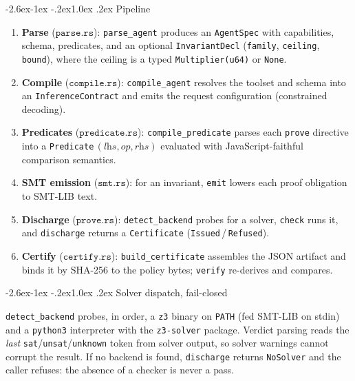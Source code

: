 \documentclass[11pt]{article}
\makeatletter
\renewcommand\subsection{\@startsection{subsection}{2}{\z@}%
  {-2.6ex\@plus -1ex \@minus -.2ex}{1.0ex \@plus .2ex}%
  {\normalfont\sffamily\large\bfseries}}
\theoremstyle{plain}
\theoremstyle{definition}
\theoremstyle{remark}
\makeatother
\begin{document}
\subsection{Pipeline}

\begin{enumerate}
\item \textbf{Parse} ($\texttt{parse.rs}$): \texttt{parse\_agent} produces an
  \texttt{AgentSpec} with capabilities, schema, predicates, and an optional
  \texttt{InvariantDecl} (\texttt{family}, \texttt{ceiling}, \texttt{bound}),
  where the ceiling is a typed \texttt{Multiplier(u64)} or \texttt{None}.
\item \textbf{Compile} ($\texttt{compile.rs}$): \texttt{compile\_agent}
  resolves the toolset and schema into an \texttt{InferenceContract} and emits
  the request configuration (constrained decoding).
\item \textbf{Predicates} ($\texttt{predicate.rs}$):
  \texttt{compile\_predicate} parses each \texttt{prove} directive into a
  \texttt{Predicate}\,$(\textit{lhs},\textit{op},\textit{rhs})$ evaluated with
  JavaScript-faithful comparison semantics.
\item \textbf{SMT emission} ($\texttt{smt.rs}$): for an invariant,
  \texttt{emit} lowers each proof obligation to SMT-LIB text.
\item \textbf{Discharge} ($\texttt{prove.rs}$): \texttt{detect\_backend}
  probes for a solver, \texttt{check} runs it, and \texttt{discharge} returns a
  \texttt{Certificate} (\texttt{Issued}\,/\,\texttt{Refused}).
\item \textbf{Certify} ($\texttt{certify.rs}$): \texttt{build\_certificate}
  assembles the JSON artifact and binds it by SHA-256 to the policy bytes;
  \texttt{verify} re-derives and compares.
\end{enumerate}

\subsection{Solver dispatch, fail-closed}

\texttt{detect\_backend} probes, in order, a \texttt{z3} binary on
\texttt{PATH} (fed SMT-LIB on stdin) and a \texttt{python3} interpreter with
the \texttt{z3-solver} package. Verdict parsing reads the \emph{last}
\texttt{sat}/\texttt{unsat}/\texttt{unknown} token from solver output, so
solver warnings cannot corrupt the result. If no backend is found,
\texttt{discharge} returns \texttt{NoSolver} and the caller refuses: the
absence of a checker is never a pass.
\end{document}

